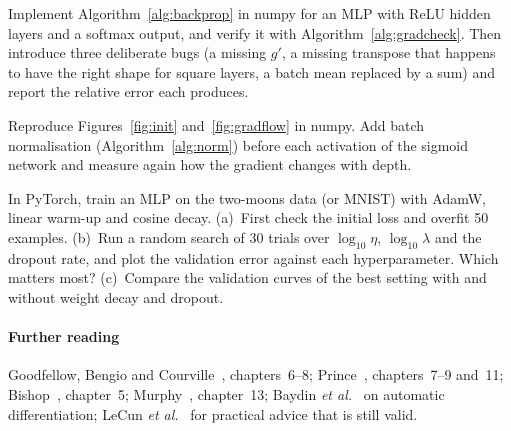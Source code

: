 \documentclass[11pt]{article}
\begin{document}
\begin{questions}
\begin{programming}
\item Implement Algorithm~\ref{alg:backprop} in numpy for an MLP with ReLU hidden layers and a softmax output, and verify it
  with Algorithm~\ref{alg:gradcheck}. Then introduce three deliberate bugs (a missing $g'$, a missing transpose that happens
  to have the right shape for square layers, a batch mean replaced by a sum) and report the relative error each produces.
\item Reproduce Figures~\ref{fig:init} and~\ref{fig:gradflow} in numpy. Add batch normalisation (Algorithm~\ref{alg:norm})
  before each activation of the sigmoid network and measure again how the gradient changes with depth.
\item In PyTorch, train an MLP on the two-moons data (or MNIST) with AdamW, linear warm-up and cosine decay. (a)~First
  check the initial loss and overfit 50 examples. (b)~Run a random search of 30 trials over $\log_{10}\eta$, $\log_{10}\lambda$
  and the dropout rate, and plot the validation error against each hyperparameter. Which matters most? (c)~Compare the
  validation curves of the best setting with and without weight decay and dropout.
\end{programming}
\end{questions}

\paragraph{Further reading} Goodfellow, Bengio and Courville~\cite{goodfellow2016}, chapters~6--8; Prince~\cite{prince2023},
chapters~7--9 and~11; Bishop~\cite{bishop2006}, chapter~5; Murphy~\cite{murphy2022}, chapter~13; Baydin
\emph{et al.}~\cite{baydin2018} on automatic differentiation; LeCun \emph{et al.}~\cite{lecun1998} for practical advice
that is still valid.
\end{document}
